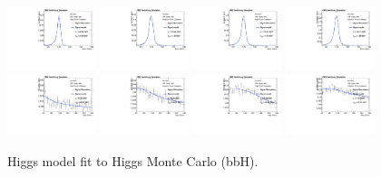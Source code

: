 \begin{figure}[h]
  \centering
\includegraphics[width=0.23\textwidth]{figures/sec-signals/HiggsShapes/bbh_HM_signal_fit_mgg_cat0.pdf}
\includegraphics[width=0.23\textwidth]{figures/sec-signals/HiggsShapes/bbh_HM_signal_fit_mgg_cat1.pdf}
\includegraphics[width=0.23\textwidth]{figures/sec-signals/HiggsShapes/bbh_LM_signal_fit_mgg_cat0.pdf}
\includegraphics[width=0.23\textwidth]{figures/sec-signals/HiggsShapes/bbh_LM_signal_fit_mgg_cat1.pdf}
\includegraphics[width=0.23\textwidth]{figures/sec-signals/HiggsShapes/bbh_HM_signal_fit_mjj_cat0.pdf}
\includegraphics[width=0.23\textwidth]{figures/sec-signals/HiggsShapes/bbh_HM_signal_fit_mjj_cat1.pdf}
\includegraphics[width=0.23\textwidth]{figures/sec-signals/HiggsShapes/bbh_LM_signal_fit_mjj_cat0.pdf}
\includegraphics[width=0.23\textwidth]{figures/sec-signals/HiggsShapes/bbh_LM_signal_fit_mjj_cat1.pdf}
  \caption{Higgs model fit to Higgs Monte Carlo (bbH).}
  \label{fig:higgs_fit_bbh}
\end{figure}

